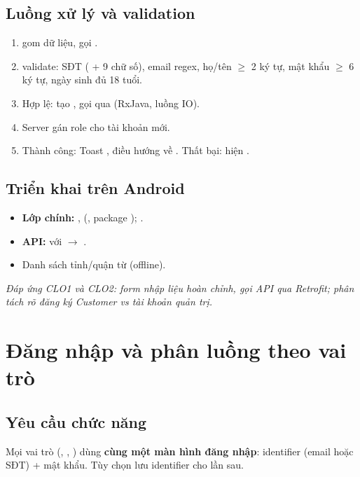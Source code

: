 \subsection{Luồng xử lý và validation}
\begin{enumerate}
    \item {} gom dữ liệu, gọi
    .
    \item {} validate: SĐT ( + 9 chữ số),
    email regex, họ/tên $\geq$ 2 ký tự, mật khẩu $\geq$ 6 ký tự, ngày sinh
    đủ 18 tuổi.
    \item Hợp lệ: tạo , gọi
     qua  (RxJava, luồng
    IO).
    \item Server gán role  cho tài khoản mới.
    \item Thành công: Toast , điều hướng về . Thất bại: hiện
    .
\end{enumerate}

\subsection{Triển khai trên Android}
\begin{itemize}
    \item \textbf{Lớp chính:} ,
     (, package
    ); .
    \item \textbf{API:}  với
     $\rightarrow$ .
    \item Danh sách tỉnh/quận từ  (offline).
\end{itemize}

\textit{Đáp ứng CLO1 và CLO2: form nhập liệu hoàn chỉnh, gọi API qua
Retrofit; phân tách rõ đăng ký Customer vs tài khoản quản trị.}

\section{Đăng nhập và phân luồng theo vai trò}

\subsection{Yêu cầu chức năng}
Mọi vai trò (, , ) dùng
\textbf{cùng một màn hình đăng nhập}: identifier (email hoặc SĐT) + mật
khẩu. Tùy chọn  lưu identifier cho lần sau.

